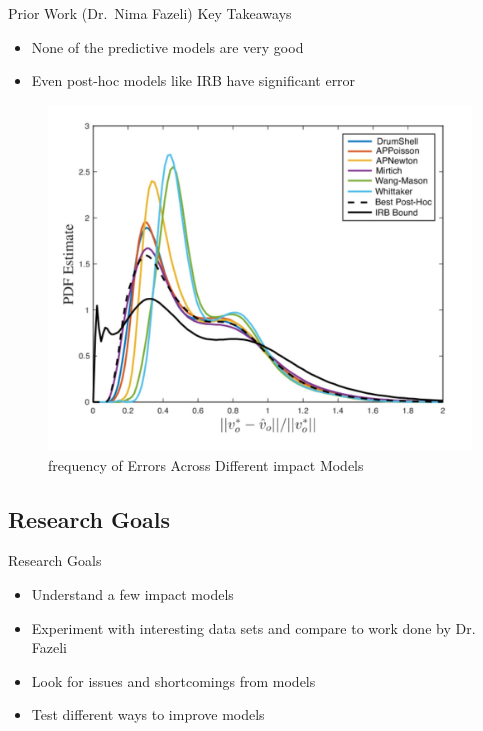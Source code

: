 \setlength{\belowcaptionskip}{-10pt}
\begin{frame}{Prior Work  (Dr.\ Nima Fazeli)}
    Key Takeaways \\
    \begin{itemize}
        \item None of the predictive models are very good
        \item Even post-hoc models like IRB have significant error
    \end{itemize}
 \begin{figure}
        \centering
        \includegraphics[scale=0.35]{figures/nimaFigModels.jpg}
        \caption{frequency of Errors Across Different impact Models\cite{nima2}}
        \label{fig:nimaModels}
\end{figure}
\end{frame}

\subsection{Research Goals}
\begin{frame}{Research Goals}
\begin{itemize}
    \item Understand a few impact models
    \item Experiment with interesting data sets and compare to work done by Dr. Fazeli
    \item Look for issues and shortcomings from models
    \item Test different ways to improve models
\end{itemize}
\end{frame}   


